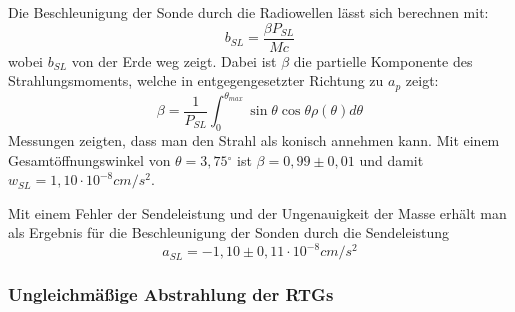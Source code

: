 Die Beschleunigung der Sonde durch die Radiowellen l\"asst sich
berechnen mit:
\begin{equation}
b_{\mathit{SL}}=\frac{\beta P_{\mathit{SL}}}{\mathit{Mc}}
\end{equation}
wobei $b_{\mathit{SL}}$ von der Erde weg zeigt. Dabei ist $\beta $ die
partielle Komponente des Strahlungsmoments, welche in entgegengesetzter
Richtung zu $a_{p}$ zeigt\cite{Anderson2002}:
\begin{equation}
\beta =\frac{1}{P_{\mathit{SL}}}\int _{0}^{\theta _{\mathit{max}}}\sin
\theta \cos \theta \rho (\theta )d\theta
\end{equation}
Messungen  zeigten\cite{Anderson2002}, dass man den Strahl als konisch annehmen kann.
Mit einem Gesamt\"offnungswinkel von $\theta =3,75{}^{\circ}$ ist
$\beta =0,99\pm 0,01$ und damit $w_{\mathit{SL}}=1,10\cdot
10^{-8}\mathit{cm}/s^{2}$.

Mit einem Fehler der Sendeleistung und der Ungenauigkeit der Masse
erh\"alt man als Ergebnis f\"ur die Beschleunigung der Sonden durch die
Sendeleistung
\begin{equation}
a_{\mathit{SL}}=-1,10\pm 0,11\cdot 10^{-8}\mathit{cm}/s^{2}
\end{equation}


\bigskip

\subsubsection{Ungleichm\"a{\ss}ige Abstrahlung der RTGs}

